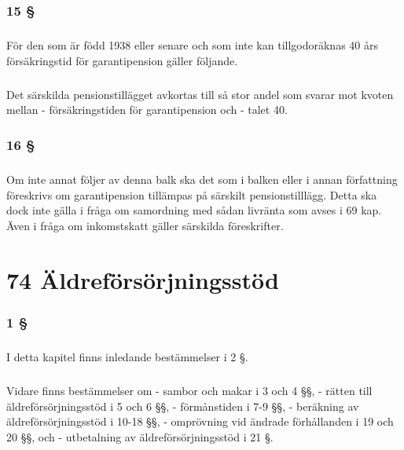\documentclass[a4paper,notitlepage,openany,10pt]{book}
\begin{document}
\subsection*{15 §}
\paragraph*{}
För den som är född 1938 eller senare och som inte kan tillgodoräknas 40 års försäkringstid för garantipension gäller följande.
\paragraph*{}
Det särskilda pensionstillägget avkortas till så stor andel som svarar mot kvoten mellan
\newline - försäkringstiden för garantipension och
\newline - talet 40.
\subsection*{16 §}
\paragraph*{}
Om inte annat följer av denna balk ska det som i balken eller i annan författning föreskrivs om garantipension tillämpas på särskilt pensionstilllägg. Detta ska dock inte gälla i fråga om samordning med sådan livränta som avses i 69 kap. Även i fråga om inkomstskatt gäller särskilda föreskrifter.
\chapter*{74 Äldreförsörjningsstöd}
\subsection*{1 §}
\paragraph*{}
I detta kapitel finns inledande bestämmelser i 2 §.
\paragraph*{}
Vidare finns bestämmelser om
\newline - sambor och makar i 3 och 4 §§,
\newline - rätten till äldreförsörjningsstöd i 5 och 6 §§,
\newline - förmånstiden i 7-9 §§,
\newline - beräkning av äldreförsörjningsstöd i 10-18 §§,
\newline - omprövning vid ändrade förhållanden i 19 och 20 §§, och
\newline - utbetalning av äldreförsörjningsstöd i 21 §.
\end{document}
